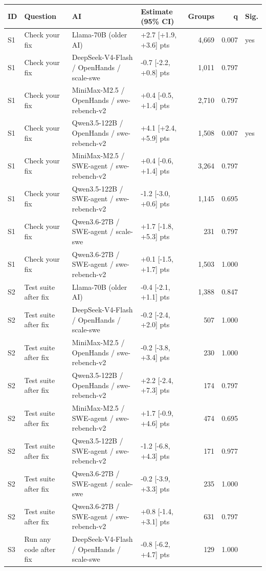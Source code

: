 \begin{tabular}{llllrrl}
\toprule
ID & Question & AI & Estimate (95\% CI) & Groups & q & Sig. \\
\midrule
S1 & Check your fix & Llama-70B (older AI) & +2.7 [+1.9, +3.6] pts & 4,669 & 0.007 & yes \\
S1 & Check your fix & DeepSeek-V4-Flash / OpenHands / scale-swe & -0.7 [-2.2, +0.8] pts & 1,011 & 0.797 &  \\
S1 & Check your fix & MiniMax-M2.5 / OpenHands / swe-rebench-v2 & +0.4 [-0.5, +1.4] pts & 2,710 & 0.797 &  \\
S1 & Check your fix & Qwen3.5-122B / OpenHands / swe-rebench-v2 & +4.1 [+2.4, +5.9] pts & 1,508 & 0.007 & yes \\
S1 & Check your fix & MiniMax-M2.5 / SWE-agent / swe-rebench-v2 & +0.4 [-0.6, +1.4] pts & 3,264 & 0.797 &  \\
S1 & Check your fix & Qwen3.5-122B / SWE-agent / swe-rebench-v2 & -1.2 [-3.0, +0.6] pts & 1,145 & 0.695 &  \\
S1 & Check your fix & Qwen3.6-27B / SWE-agent / scale-swe & +1.7 [-1.8, +5.3] pts & 231 & 0.797 &  \\
S1 & Check your fix & Qwen3.6-27B / SWE-agent / swe-rebench-v2 & +0.1 [-1.5, +1.7] pts & 1,503 & 1.000 &  \\
S2 & Test suite after fix & Llama-70B (older AI) & -0.4 [-2.1, +1.1] pts & 1,388 & 0.847 &  \\
S2 & Test suite after fix & DeepSeek-V4-Flash / OpenHands / scale-swe & -0.2 [-2.4, +2.0] pts & 507 & 1.000 &  \\
S2 & Test suite after fix & MiniMax-M2.5 / OpenHands / swe-rebench-v2 & -0.2 [-3.8, +3.4] pts & 230 & 1.000 &  \\
S2 & Test suite after fix & Qwen3.5-122B / OpenHands / swe-rebench-v2 & +2.2 [-2.4, +7.3] pts & 174 & 0.797 &  \\
S2 & Test suite after fix & MiniMax-M2.5 / SWE-agent / swe-rebench-v2 & +1.7 [-0.9, +4.6] pts & 474 & 0.695 &  \\
S2 & Test suite after fix & Qwen3.5-122B / SWE-agent / swe-rebench-v2 & -1.2 [-6.8, +4.3] pts & 171 & 0.977 &  \\
S2 & Test suite after fix & Qwen3.6-27B / SWE-agent / scale-swe & -0.2 [-3.9, +3.3] pts & 235 & 1.000 &  \\
S2 & Test suite after fix & Qwen3.6-27B / SWE-agent / swe-rebench-v2 & +0.8 [-1.4, +3.1] pts & 631 & 0.797 &  \\
S3 & Run any code after fix & DeepSeek-V4-Flash / OpenHands / scale-swe & -0.8 [-6.2, +4.7] pts & 129 & 1.000 &  \\

\end{tabular}
